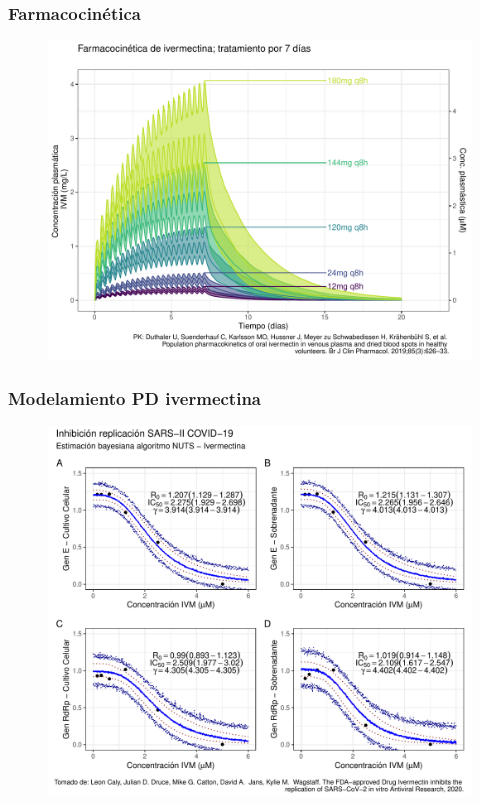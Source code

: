 \documentclass[12pt]{beamer}
\begin{document}
	\begin{frame}	
		\frametitle{Farmacocinética}			
		\begin{figure}
			\centering
			\includegraphics[width=0.9\linewidth]{../modelo_PD_2/figuras/G1}
			\label{fig:g1}
		\end{figure}
	\end{frame}
	
	\begin{frame}
		\frametitle{Modelamiento PD ivermectina}
		\begin{figure}
			\centering
			\includegraphics[width=0.8\linewidth]{../modelo_PD/modelo_ivermectina}
			\label{fig:modeloivermectina}
		\end{figure}
	\end{frame}
	
\end{document}
